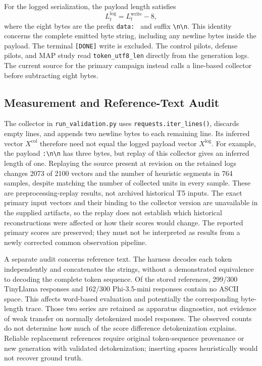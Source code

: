 \documentclass[electronics,article,submit,pdftex,moreauthors]{Definitions/mdpi}
\begin{document}
For the logged serialization, the payload length satisfies
\begin{equation}
L^{\mathrm{log}}_t = L^{\mathrm{write}}_t - 8,
\end{equation}
where the eight bytes are the prefix \texttt{data: } and suffix \texttt{\textbackslash n\textbackslash n}. This identity concerns the complete emitted byte string, including any newline bytes inside the payload. The terminal \texttt{[DONE]} write is excluded. The control pilots, defense pilots, and MAP study read \texttt{token\_utf8\_len} directly from the generation logs. The current source for the primary campaign instead calls a line-based collector before subtracting eight bytes.

\subsection{Measurement and Reference-Text Audit}\label{sec:measurement-audit}
The collector in \texttt{run\_validation.py} uses \texttt{requests.iter\_lines()}, discards empty lines, and appends two newline bytes to each remaining line. Its inferred vector $X^{\mathrm{col}}$ therefore need not equal the logged payload vector $X^{\mathrm{log}}$. For example, the payload \texttt{:\textbackslash n\textbackslash n} has three bytes, but replay of this collector gives an inferred length of one. Replaying the source present at revision on the retained logs changes 2073 of 2100 vectors and the number of heuristic segments in 764 samples, despite matching the number of collected units in every sample. These are preprocessing-replay results, not archived historical T5 inputs. The exact primary input vectors and their binding to the collector version are unavailable in the supplied artifacts, so the replay does not establish which historical reconstructions were affected or how their scores would change. The reported primary scores are preserved; they must not be interpreted as results from a newly corrected common observation pipeline.

A separate audit concerns reference text. The harness decodes each token independently and concatenates the strings, without a demonstrated equivalence to decoding the complete token sequence. Of the stored references, 299/300 TinyLlama responses and 162/300 Phi-3.5-mini responses contain no ASCII space. This affects word-based evaluation and potentially the corresponding byte-length trace. Those two series are retained as apparatus diagnostics, not evidence of weak transfer on normally detokenized model responses. The observed counts do not determine how much of the score difference detokenization explains. Reliable replacement references require original token-sequence provenance or new generation with validated detokenization; inserting spaces heuristically would not recover ground truth.
\end{document}
